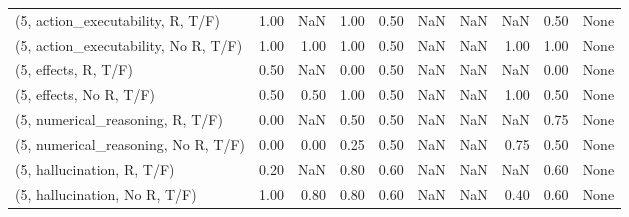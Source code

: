 \begin{table*}[h!]
\begin{adjustbox}{width=2\columnwidth,center}
\begin{tabular}{lrrr|rrr|rrr}
(5, action\_executability, R, T/F)    &                      1.00 &                   NaN &                      1.00 &                          0.50 &                       NaN &                           NaN &                                    NaN &                               0.50 &                                  None \\
(5, action\_executability, No R, T/F) &                      1.00 &                  1.00 &                      1.00 &                          0.50 &                       NaN &                           NaN &                                   1.00 &                               1.00 &                                  None \\
(5, effects, R, T/F)                 &                      0.50 &                   NaN &                      0.00 &                          0.50 &                       NaN &                           NaN &                                    NaN &                               0.00 &                                  None \\
(5, effects, No R, T/F)              &                      0.50 &                  0.50 &                      1.00 &                          0.50 &                       NaN &                           NaN &                                   1.00 &                               0.50 &                                  None \\
(5, numerical\_reasoning, R, T/F)     &                      0.00 &                   NaN &                      0.50 &                          0.50 &                       NaN &                           NaN &                                    NaN &                               0.75 &                                  None \\
(5, numerical\_reasoning, No R, T/F)  &                      0.00 &                  0.00 &                      0.25 &                          0.50 &                       NaN &                           NaN &                                   0.75 &                               0.50 &                                  None \\
(5, hallucination, R, T/F)           &                      0.20 &                   NaN &                      0.80 &                          0.60 &                       NaN &                           NaN &                                    NaN &                               0.60 &                                  None \\
(5, hallucination, No R, T/F)        &                      1.00 &                  0.80 &                      0.80 &                          0.60 &                       NaN &                           NaN &                                   0.40 &                               0.60 &                                  None \\

\end{tabular}
\end{adjustbox}
\end{table*}
